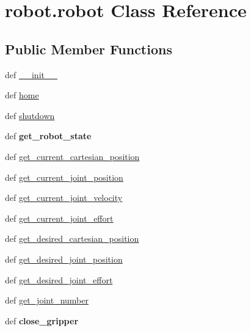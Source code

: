 \hypertarget{classrobot_1_1robot}{\section{robot.\-robot Class Reference}
\label{classrobot_1_1robot}
}
\subsection*{Public Member Functions}
\begin{DoxyCompactItemize}
\item 
def \hyperlink{classrobot_1_1robot_ada0f0d621d7b7f3c82f103ca39655e57}{\-\_\-\-\_\-init\-\_\-\-\_\-}
\item 
def \hyperlink{classrobot_1_1robot_acfcfba4c2e3a5fff6a16bbfa23a43f0b}{home}
\item 
def \hyperlink{classrobot_1_1robot_a269263585bfeaf41c99cb917fbd3b2a4}{shutdown}
\item 
\hypertarget{classrobot_1_1robot_a269754c183476c1af79982fad7a913aa}{def {\bfseries get\-\_\-robot\-\_\-state}}\label{classrobot_1_1robot_a269754c183476c1af79982fad7a913aa}

\item 
def \hyperlink{classrobot_1_1robot_a24d47d697c485ec681cea22d1b5d2eef}{get\-\_\-current\-\_\-cartesian\-\_\-position}
\item 
def \hyperlink{classrobot_1_1robot_a65a10aad3fb07d7b740c5aeb6a98f4fe}{get\-\_\-current\-\_\-joint\-\_\-position}
\item 
def \hyperlink{classrobot_1_1robot_a3f936417edb192eea87094cf4f1ebf81}{get\-\_\-current\-\_\-joint\-\_\-velocity}
\item 
def \hyperlink{classrobot_1_1robot_a69ee320aa8bd577693a86dc57edbe88d}{get\-\_\-current\-\_\-joint\-\_\-effort}
\item 
def \hyperlink{classrobot_1_1robot_a6c1363d7ee90df1bd551d21c4bf85405}{get\-\_\-desired\-\_\-cartesian\-\_\-position}
\item 
def \hyperlink{classrobot_1_1robot_a8ad506ad78ebcbf8537d68acd3221d46}{get\-\_\-desired\-\_\-joint\-\_\-position}
\item 
def \hyperlink{classrobot_1_1robot_acb3f4d16c51d3285750c6b102f435ecd}{get\-\_\-desired\-\_\-joint\-\_\-effort}
\item 
def \hyperlink{classrobot_1_1robot_a3381917875e5eb4a2580f89d30a29048}{get\-\_\-joint\-\_\-number}
\item 
\hypertarget{classrobot_1_1robot_ad9aa35ed46f7d41e0942474de6a048bd}{def {\bfseries close\-\_\-gripper}}\label{classrobot_1_1robot_ad9aa35ed46f7d41e0942474de6a048bd}


\end{DoxyCompactItemize}
